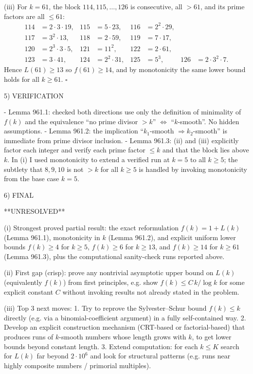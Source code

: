 (iii) For $k=61$, the block $114,115,\dots,126$ is consecutive, all $>61$, and its prime factors are all $\le 61$:
\[
\begin{aligned}
114&=2\cdot 3\cdot 19, &115&=5\cdot 23, &116&=2^2\cdot 29,\\
117&=3^2\cdot 13, &118&=2\cdot 59, &119&=7\cdot 17,\\
120&=2^3\cdot 3\cdot 5, &121&=11^2, &122&=2\cdot 61,\\
123&=3\cdot 41, &124&=2^2\cdot 31, &125&=5^3, &126&=2\cdot 3^2\cdot 7.
\end{aligned}
\]
Hence $L(61)\ge 13$ so $f(61)\ge 14$, and by monotonicity the same lower bound holds for all $k\ge 61$. $\square$

5) VERIFICATION

- Lemma 961.1: checked both directions use only the definition of minimality of $f(k)$ and the equivalence “no prime divisor $>k$” $\Leftrightarrow$ “$k$-smooth”. No hidden assumptions.
- Lemma 961.2: the implication “$k_1$-smooth $\Rightarrow k_2$-smooth” is immediate from prime divisor inclusion.
- Lemma 961.3: (ii) and (iii) explicitly factor each integer and verify each prime factor $\le k$ and that the block lies above $k$. In (i) I used monotonicity to extend a verified run at $k=5$ to all $k\ge 5$; the subtlety that $8,9,10$ is not $>k$ for all $k\ge 5$ is handled by invoking monotonicity from the base case $k=5$.

6) FINAL

**UNRESOLVED**

(i) Strongest proved partial result: the exact reformulation $f(k)=1+L(k)$ (Lemma 961.1), monotonicity in $k$ (Lemma 961.2), and explicit uniform lower bounds $f(k)\ge 4$ for $k\ge 5$, $f(k)\ge 6$ for $k\ge 13$, and $f(k)\ge 14$ for $k\ge 61$ (Lemma 961.3), plus the computational sanity-check runs reported above.

(ii) First gap (crisp): prove any nontrivial asymptotic upper bound on $L(k)$ (equivalently $f(k)$) from first principles, e.g. show $f(k)\le C\,k/\log k$ for some explicit constant $C$ without invoking results not already stated in the problem.

(iii) Top 3 next moves:
1. Try to reprove the Sylvester--Schur bound $f(k)\le k$ directly (e.g. via a binomial-coefficient argument) in a fully self-contained way.
2. Develop an explicit construction mechanism (CRT-based or factorial-based) that produces runs of $k$-smooth numbers whose length grows with $k$, to get lower bounds beyond constant length.
3. Extend computation: for each $k\le K$ search for $L(k)$ far beyond $2\cdot 10^6$ and look for structural patterns (e.g. runs near highly composite numbers / primorial multiples).

